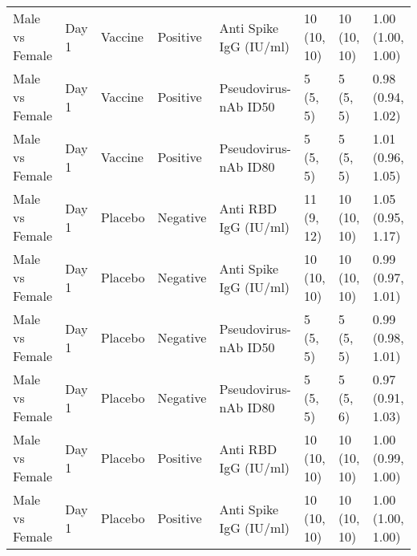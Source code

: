 \documentclass[]{book}
\theoremstyle{definition}
\theoremstyle{definition}
\theoremstyle{definition}
\newcommand{\1}{\mathbbm{1}}
\begin{document}
\begin{landscape}
\begin{ThreePartTable}
\begin{longtable}[t]{>{\raggedright\arraybackslash}p{2.7cm}lllllll}
Male vs Female & Day 1 & Vaccine & Positive & Anti Spike IgG (IU/ml) & \makecell[l]{10\\(10, 10)} & \makecell[l]{10\\(10, 10)} & \makecell[l]{1.00\\(1.00, 1.00)}\\
Male vs Female & Day 1 & Vaccine & Positive & Pseudovirus-nAb ID50 & \makecell[l]{5\\(5, 5)} & \makecell[l]{5\\(5, 5)} & \makecell[l]{0.98\\(0.94, 1.02)}\\
Male vs Female & Day 1 & Vaccine & Positive & Pseudovirus-nAb ID80 & \makecell[l]{5\\(5, 5)} & \makecell[l]{5\\(5, 5)} & \makecell[l]{1.01\\(0.96, 1.05)}\\
\addlinespace
Male vs Female & Day 1 & Placebo & Negative & Anti RBD IgG (IU/ml) & \makecell[l]{11\\(9, 12)} & \makecell[l]{10\\(10, 10)} & \makecell[l]{1.05\\(0.95, 1.17)}\\
Male vs Female & Day 1 & Placebo & Negative & Anti Spike IgG (IU/ml) & \makecell[l]{10\\(10, 10)} & \makecell[l]{10\\(10, 10)} & \makecell[l]{0.99\\(0.97, 1.01)}\\
Male vs Female & Day 1 & Placebo & Negative & Pseudovirus-nAb ID50 & \makecell[l]{5\\(5, 5)} & \makecell[l]{5\\(5, 5)} & \makecell[l]{0.99\\(0.98, 1.01)}\\
Male vs Female & Day 1 & Placebo & Negative & Pseudovirus-nAb ID80 & \makecell[l]{5\\(5, 5)} & \makecell[l]{5\\(5, 6)} & \makecell[l]{0.97\\(0.91, 1.03)}\\
Male vs Female & Day 1 & Placebo & Positive & Anti RBD IgG (IU/ml) & \makecell[l]{10\\(10, 10)} & \makecell[l]{10\\(10, 10)} & \makecell[l]{1.00\\(0.99, 1.00)}\\
\addlinespace
Male vs Female & Day 1 & Placebo & Positive & Anti Spike IgG (IU/ml) & \makecell[l]{10\\(10, 10)} & \makecell[l]{10\\(10, 10)} & \makecell[l]{1.00\\(1.00, 1.00)}\\

\end{longtable}
\end{ThreePartTable}
\end{landscape}
\end{document}

